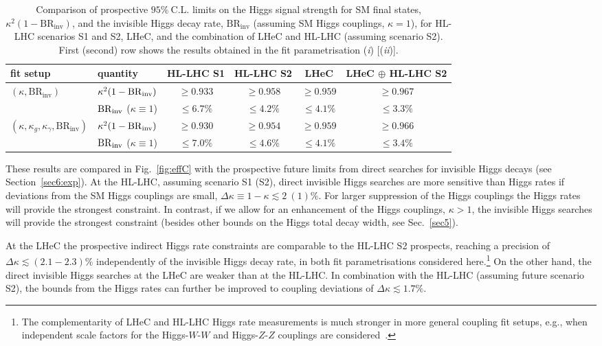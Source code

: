 \documentclass[../report.tex]{subfiles}
\begin{document}
\begin{table}
\centering
\begin{tabular}{ l |  l | cccc}
\hline
fit setup &  quantity   & HL-LHC S1   & HL-LHC S2   & LHeC	  & LHeC $\oplus$ HL-LHC S2 \\
\hline
\multirow{2}{*}{$(\kappa, \mathrm{BR}_\text{inv})$}                         &  $\kappa^2 (1-\mathrm{BR}_\mathrm{inv})$ &  $\ge 0.933$ & $\ge 0.958$ & $\ge 0.959$  & $\ge 0.967$ \\
                                                                            &  $\mathrm{BR}_\mathrm{inv}$ ($\kappa\equiv 1$) & $\le 6.7\%$ & $\le 4.2\% $ & $\le 4.1\%$ & $\le 3.3\%$\\
\hline									  
\multirow{2}{*}{$(\kappa, \kappa_g, \kappa_\gamma,  \mathrm{BR}_\text{inv})$}   &  $\kappa^2 (1-\mathrm{BR}_\mathrm{inv})$ & $\ge0.930$ &  $\ge0.954$ & $\ge0.959$ & $\ge0.966$\\
                                                                                &   $\mathrm{BR}_\mathrm{inv}$ ($\kappa\equiv 1$) & $\le7.0\%$ & $\le4.6\%$ & $\le4.1\%$ & $\le3.4\%$\\

\hline
\end{tabular}
\caption{{Comparison of prospective $95\%~\mathrm{C.L.}$ limits on the Higgs signal strength for SM final states, $\kappa^2(1-\mathrm{BR}_\text{inv})$, and the invisible Higgs decay rate, $\mathrm{BR}_\text{inv}$ (assuming SM Higgs couplings, $\kappa =1$), for HL-LHC scenarios S1 and S2, LHeC, and the combination of LHeC and HL-LHC (assuming scenario S2). First (second) row shows the results obtained in the fit parametrisation (\emph{i}) [(\emph{ii})].}}
\label{tab:effC_limits}
\end{table}


These results are compared in Fig.~\ref{fig:effC} with the prospective future limits from direct searches for invisible Higgs decays (see Section~\ref{sec6:exp}). At the HL-LHC, assuming scenario S1 (S2), direct invisible Higgs searches are more sensitive than Higgs rates if deviations from the SM Higgs couplings are small, $\Delta \kappa \equiv 1- \kappa \lesssim 2~(1)\%$. For larger suppression of the Higgs couplings the Higgs rates will provide the strongest constraint. In contrast, if we allow for an enhancement of the Higgs couplings, $\kappa > 1$, the invisible Higgs searches will provide the strongest constraint (besides other bounds on the Higgs total decay width, see Sec.~\ref{sec5}).



At the LHeC the prospective indirect Higgs rate constraints are comparable to the HL-LHC S2 prospects, reaching a precision of $\Delta \kappa \lesssim (2.1-2.3)\%$ independently of the invisible Higgs decay rate, in both fit parametrisations considered here.\footnote{The complementarity of LHeC and HL-LHC Higgs rate measurements is much stronger in more general coupling fit setups, e.g., when independent scale factors for the Higgs-$W$-$W$ and Higgs-$Z$-$Z$ couplings are considered~\cite{uta}.} On the other hand, the direct invisible Higgs searches at the LHeC are weaker than at the HL-LHC. In combination with the HL-LHC (assuming future scenario S2), the bounds from the Higgs rates can further be improved to coupling deviations of $\Delta \kappa \lesssim1.7\%$. 
\end{document}
